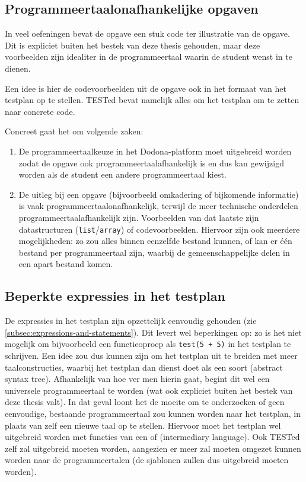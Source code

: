 \subsection{Programmeertaalonafhankelijke opgaven}\label{subsec:programmeertaalonafhankelijke-opgaven}

In veel oefeningen bevat de opgave een stuk code ter illustratie van de opgave.
Dit is expliciet buiten het bestek van deze thesis gehouden, maar deze voorbeelden zijn idealiter in de programmeertaal waarin de student wenst in te dienen.

Een idee is hier de codevoorbeelden uit de opgave ook in het formaat van het testplan op te stellen.
TESTed bevat namelijk alles om het testplan om te zetten naar concrete code.

Concreet gaat het om volgende zaken:
\begin{enumerate}
    \item De programmeertaalkeuze in het Dodona-platform moet uitgebreid worden zodat de opgave ook programmeertaalafhankelijk is en dus kan gewijzigd worden als de student een andere programmeertaal kiest.
    \item De uitleg bij een opgave (bijvoorbeeld omkadering of bijkomende informatie) is vaak programmeertaalonafhankelijk, terwijl de meer technische onderdelen programmeertaalafhankelijk zijn.
    Voorbeelden van dat laatste zijn datastructuren (\texttt{list}/\texttt{array}) of codevoorbeelden.
    Hiervoor zijn ook meerdere mogelijkheden: zo zou alles binnen eenzelfde bestand kunnen, of kan er één bestand per programmeertaal zijn, waarbij de gemeenschappelijke delen in een apart bestand komen.
\end{enumerate}

\subsection{Beperkte expressies in het testplan}\label{subsec:beperkte-expressies-in-het-testplan}

De expressies in het testplan zijn opzettelijk eenvoudig gehouden (zie \cref{subsec:expressions-and-statements}).
Dit levert wel beperkingen op: zo is het niet mogelijk om bijvoorbeeld een functieoproep als \texttt{test(5 + 5)} in het testplan te schrijven.
Een idee zou dus kunnen zijn om het testplan uit te breiden met meer taalconstructies, waarbij het testplan dan dienst doet als een soort  (abstract syntax tree).
Afhankelijk van hoe ver men hierin gaat, begint dit wel een universele programmeertaal te worden (wat ook expliciet buiten het bestek van deze thesis valt).
In dat geval loont het de moeite om te onderzoeken of geen eenvoudige, bestaande programmeertaal  zou kunnen worden naar het testplan, in plaats van zelf een nieuwe taal op te stellen.
Hiervoor moet het testplan wel uitgebreid worden met functies van een  of  (intermediary language).
Ook TESTed zelf zal uitgebreid moeten worden, aangezien er meer zal moeten omgezet kunnen worden naar de programmeertalen (de sjablonen zullen dus uitgebreid moeten worden).


